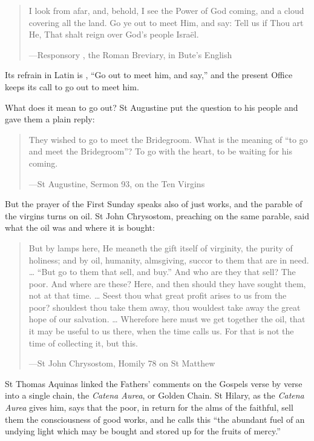 \begin{quote}
I look from afar, and, behold, I see the Power of God coming, and a cloud
covering all the land. Go ye out to meet Him, and say: Tell us if Thou art He,
That shalt reign over God's people Israël.\par
{\smallskip\noindent\small ---Responsory , the Roman Breviary, in Bute's English\par}
\end{quote}

\noindent Its refrain in Latin is , ``Go out to
meet him, and say,'' and the present Office keeps its call to go out to meet
him.

What does it mean to go out? St Augustine put the question to his people and
gave them a plain reply:

\begin{quote}
They wished to go to meet the Bridegroom. What is the meaning of ``to go and
meet the Bridegroom''? To go with the heart, to be waiting for his coming.\par
{\smallskip\noindent\small ---St Augustine, Sermon 93, on the Ten Virgins\par}
\end{quote}

\noindent But the prayer of the First Sunday speaks
also of just works, and the parable of the virgins turns on oil. St John
Chrysostom, preaching on the same parable, said what the oil was and
where it is bought:

\begin{quote}
But by lamps here, He meaneth the gift itself of virginity, the purity of
holiness; and by oil, humanity, almsgiving, succor to them that are in need.
\ldots{} ``But go to them that sell, and buy.'' And who are they that sell? The
poor. And where are these? Here, and then should they have sought them, not at
that time. \ldots{} Seest thou what great profit arises to us from the poor?
shouldest thou take them away, thou wouldest take away the great hope of our
salvation. \ldots{} Wherefore here must we get together the oil, that it may be
useful to us there, when the time calls us. For that is not the time of
collecting it, but this.\par
{\smallskip\noindent\small ---St John Chrysostom, Homily 78 on St Matthew\par}
\end{quote}

\noindent St Thomas Aquinas linked the Fathers' comments on the Gospels verse
by verse into a single chain, the \emph{Catena Aurea}, or Golden Chain. St
Hilary, as the \emph{Catena Aurea} gives him, says that the poor, in return for the
alms of the faithful, sell them the consciousness of good works, and he calls
this ``the abundant fuel of an undying light which may be bought and stored up
for the fruits of mercy.''

